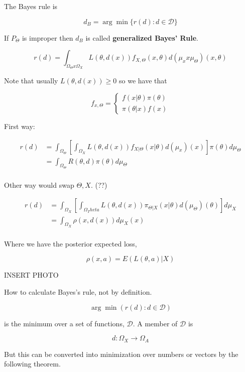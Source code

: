 \documentclass[11pt,fleqn]{book} %
\begin{document}
\begin{definition}
	The Bayes rule is 

			$$d_B = \arg\min\{r(d): d \in \mathcal{D} \} $$

If $P_\Theta$ is improper then $d_B$ is called \textbf{generalized Bayes' Rule}. 

		$$r(d) = \int_{\Omega_\Theta x \Omega_X} L(\theta, d(x))  f_{X, \Theta}(x, \theta) d(\mu_x x \mu_\Theta)(x, \theta)$$


Note that usually $L(\theta, d(x)) \geq 0$ so we have that

		$$f_{x, \Theta} = \left\{\begin{array}{ll}
			f(x|\theta) \pi(\theta)\\
			\pi(\theta|x) f(x)
		\end{array} \right. $$

First way:

		\begin{align*}
			r(d) &= \int_{\Omega_\Theta } \left[\int_{\Omega_X} L(\theta, d(x))  f_{X|\Theta}(x| \theta) d(\mu_x )(x)\right] \pi(\theta) d\mu_\Theta\\
				&= \int_{\Omega_\Theta } R(\theta, d) \pi(\theta) d\mu_\Theta\\
		\end{align*} 

Other way would swap $\Theta, X$. (??)

		\begin{align*}
			r(d) &= \int_{\Omega_X } \left[\int_{\Omega_Theta} L(\theta, d(x))  \pi_{\Theta|X}(x| \theta) d(\mu_\Theta )(\theta)\right]  d\mu_X\\
				&= \int_{\Omega_X } \rho(x, d(x)) d\mu_X(x)\\
		\end{align*} 

Where we have the posterior expected loss, 

		$$\rho(x, a) = E(L(\theta, a)|X) $$

\end{definition}

INSERT PHOTO

How to calculate Bayes's rule, not by definition. \\

\begin{definition}
	

		$$\arg\min(r(d): d \in \mathcal{D}) $$

is the minimum over a set of functions,  $\mathcal{D}$. A member of $\mathcal{D}$ is 

		$$d: \Omega_X \rightarrow \Omega_A $$

But this can be converted into minimization over numbers or vectors by the following theorem. 
\end{definition}
\end{document}
